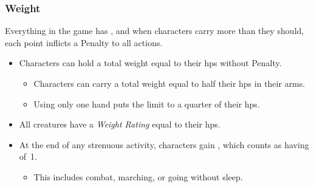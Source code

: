 \subsubsection*{Weight}

Everything in the game has , and when characters carry more than they should, each point inflicts a Penalty to all actions.

\begin{itemize}
  \item
  Characters can hold a total \gls{weight} equal to their \glspl{hp} without Penalty.
  \begin{itemize}
  \item
  Characters can carry a total \gls{weight} equal to half their \glspl{hp} in their arms.
  \item
  Using only one hand puts the limit to a quarter of their \glspl{hp}.
  \end{itemize}
  \item
  All creatures have a \textit{Weight Rating} equal to their \glspl{hp}.
  \item
  At the end of any strenuous activity, characters gain , which counts as having  of~1.
  \begin{itemize}
    \item
    This includes combat, marching, or going without sleep.
  \end{itemize}
\end{itemize}
